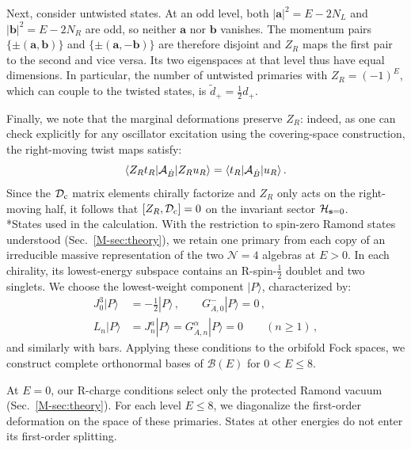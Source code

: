\documentclass[aps,onecolumn,groupedaddress,nofootinbib,pra]{revtex4-2}
\makeatletter
\renewcommand\paragraph{\@startsection{paragraph}{4}{\parindent}{\z@}{-1em}{\normalfont\normalsize\bfseries}}
\newcommand{\Def}{\mathcal D}
\newcommand{\B}{\mathcal B}
\newcommand{\cMat}{{\rm c}}
\newcommand{\bs}{\mathbf s}
\newcommand{\ba}{\mathbf a}
\newcommand{\bb}{\mathbf b}
\newcommand{\Dc}{\Def_{\cMat}}
\makeatother
\begin{document}
Next, consider untwisted states. At an odd level, both $|\ba|^2=E-2N_L$ and $|\bb|^2=E-2N_R$ are odd, so neither $\ba$ nor $\bb$ vanishes. The momentum pairs $\{\pm(\ba,\bb)\}$ and $\{\pm(\ba,-\bb)\}$ are therefore disjoint and $Z_R$ maps the first pair to the second and vice versa. Its two eigenspaces at that level thus have equal dimensions. In particular, the number of untwisted primaries with $Z_R=(-1)^E$, which can couple to the twisted states, is $\tilde d_+=\frac12 d_+$.

Finally, we note that the marginal deformations preserve $Z_R$: indeed, as one can check explicitly for any oscillator excitation using the covering-space construction, the right-moving twist maps satisfy:
\begin{equation}
 \langle Z_R t_R|{\cal A}_{\dot B}|Z_R u_R\rangle
 =\langle t_R|{\cal A}_{\dot B}|u_R\rangle \,.
\end{equation}
Since the $\Dc$ matrix elements chirally factorize and $Z_R$ only acts on the right-moving half, it follows that $[Z_R,\Dc]=0$ on the invariant sector ${\cal H}_{\bs = 0}$.\\

\paragraph*{States used in the calculation.}
With the restriction to spin-zero Ramond states understood (Sec.~\ref{M-sec:theory}), we retain one primary from each copy of an irreducible massive representation of the two $\mathcal N=4$ algebras at $E>0$. In each chirality, its lowest-energy subspace contains an R-spin-$\frac12$ doublet and two singlets. We choose the lowest-weight component $|P\rangle$, characterized by:
\begin{equation}
\begin{split}
J^3_0|P\rangle &=-\tfrac12|P\rangle\,,\qquad G^-_{\dot A,0}|P\rangle=0\,,\\
L_n|P\rangle &=J^a_n|P\rangle =G^\alpha_{\dot A,n}|P\rangle=0 \qquad(n\geq1)\,,
\end{split}
\end{equation}
and similarly with bars. Applying these conditions to the orbifold Fock spaces, we construct complete orthonormal bases of $\B(E)$ for $0<E\le8$.

At $E=0$, our R-charge conditions select only the protected Ramond vacuum (Sec.~\ref{M-sec:theory}). For each level $E\leq 8$, we diagonalize the first-order deformation on the space of these primaries. States at other energies do not enter its first-order splitting.
\end{document}
